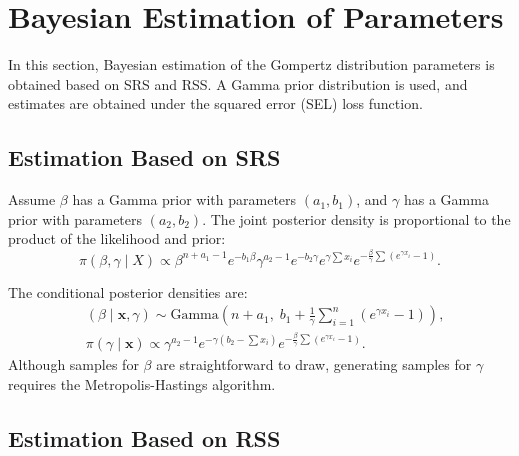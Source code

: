 \documentclass[twoside]{article}
\begin{document}
\section{Bayesian Estimation of Parameters}\label{sec2}
In this section, Bayesian estimation of the Gompertz distribution parameters is obtained based on SRS and RSS. A Gamma prior distribution is used, and estimates are obtained under the squared error (SEL) loss function.

\subsection{Estimation Based on SRS}

Assume $\beta$ has a Gamma prior with parameters $(a_1, b_1)$, and $\gamma$ has a Gamma prior with parameters $(a_2, b_2)$. The joint posterior density is proportional to the product of the likelihood and prior:
\begin{equation}
\pi(\beta,\gamma\mid X)\propto\beta^{n+a_1-1}e^{-b_1\beta}\gamma^{a_2-1}e^{-b_2\gamma}e^{\gamma\sum x_i}e^{-\frac{\beta}{\gamma}\sum(e^{\gamma x_i}-1)}.
\end{equation}

The conditional posterior densities are:
\begin{align}
&(\beta\mid\mathbf{x},\gamma)\sim\text{Gamma}\left(n+a_1,\;b_1+\frac{1}{\gamma}\sum_{i=1}^n(e^{\gamma x_i}-1)\right),\\
&\pi(\gamma\mid\mathbf{x})\propto\gamma^{a_2-1}e^{-\gamma(b_2-\sum x_i)}e^{-\frac{\beta}{\gamma}\sum(e^{\gamma x_i}-1)}.
\end{align}
Although samples for $\beta$ are straightforward to draw, generating samples for $\gamma$ requires the Metropolis-Hastings algorithm.

\subsection{Estimation Based on RSS}
\end{document}
